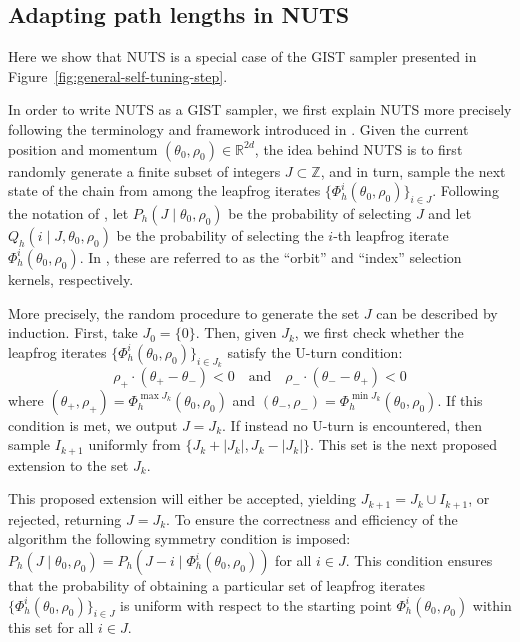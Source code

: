 \documentclass[letterpaper,11pt]{article}
\theoremstyle{plain}%
\theoremstyle{remark}
\begin{document}
\subsection{Adapting path lengths in NUTS}\label{sec:NUTS} 

Here we show that NUTS is a special case of the GIST sampler presented in Figure~\ref{fig:general-self-tuning-step}. 

In order to write NUTS as a GIST sampler, we first explain NUTS more precisely following the terminology and framework introduced in \cite{betancourt2017conceptual, durmus2023convergence}.   Given the current position and momentum $(\theta_0, \rho_0) \in \mathbb{R}^{2d}$, the idea behind NUTS is to first randomly generate a finite subset of integers $J \subset \mathbb{Z}$, and in turn, sample the next state of the chain from among the leapfrog iterates $ \{\Phi_h^i(\theta_0, \rho_0) \}_{i \in J}$. Following the notation of \cite{durmus2023convergence}, let $P_h(J \mid \theta_0, \rho_0)$ be the probability of selecting $J$ and let $Q_h(i \mid J, \theta_0, \rho_0)$ be the probability  of selecting the $i$-th leapfrog iterate $\Phi_h^i(\theta_0, \rho_0)$. In \cite{durmus2023convergence}, these are referred to as the ``orbit'' and ``index'' selection kernels, respectively. 

More precisely, the random procedure to generate the set $J$ can be described by induction. First, take $J_{0} = \{ 0 \}$. Then, given $J_k$, we first check whether the leapfrog iterates $\{\Phi_h^i(\theta_0, \rho_0) \}_{i \in J_k}$  satisfy the U-turn condition:
\[\rho_+ \cdot (\theta_+ - \theta_-) < 0 \quad \text{and} \quad \rho_- \cdot (\theta_- - \theta_+) < 0 \]
where $(\theta_+, \rho_+) = \Phi_h^{\max{J_k}}(\theta_0, \rho_0)$ and $(\theta_-, \rho_-) = \Phi_h^{\min J_k}(\theta_0, \rho_0)$. If this condition is met, we output $J = J_k$. If instead no U-turn is encountered, then sample $I_{k+1}$ uniformly from $\{ J_k + |J_k|, J_k - |J_k| \}$. This set is the next proposed extension to the set $J_k$. 

This proposed extension will either be accepted, yielding $J_{k+1} = J_k \cup I_{k+1}$, or rejected, returning $J = J_k$. To ensure the correctness and efficiency of the algorithm the following symmetry condition is imposed: $P_h(J \mid \theta_0, \rho_0) = P_h(J - i \mid \Phi_h^i(\theta_0, \rho_0))$ for all $i \in J$. This condition ensures that the probability of obtaining a particular set of leapfrog iterates $\{\Phi_h^i(\theta_0, \rho_0)\}_{i \in J}$ is uniform with respect to the starting point $\Phi_h^i(\theta_0, \rho_0)$ within this set for all $i \in J$. 
\end{document}
